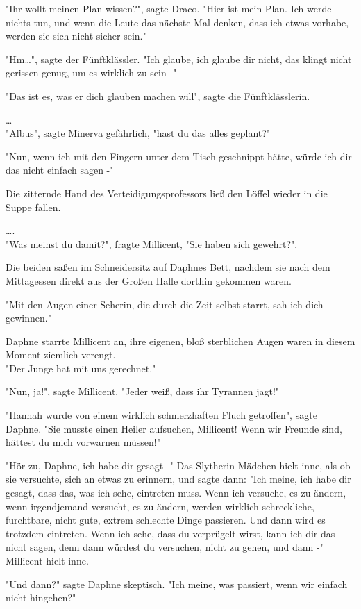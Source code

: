 {"Ihr wollt meinen Plan wissen?", sagte Draco. "Hier ist mein Plan. Ich werde nichts tun, und wenn die Leute das nächste Mal denken, dass ich etwas vorhabe, werden sie sich nicht sicher sein."

"Hm…", sagte der Fünftklässler. "Ich glaube, ich glaube dir nicht, das klingt nicht gerissen genug, um es wirklich zu sein -"

"Das ist es, was er dich glauben machen will", sagte die Fünftklässlerin.

…\\ "Albus", sagte Minerva gefährlich, "hast du das alles geplant?"

"Nun, wenn ich mit den Fingern unter dem Tisch geschnippt hätte, würde ich dir das nicht einfach sagen -"

Die zitternde Hand des Verteidigungsprofessors ließ den Löffel wieder in die Suppe fallen.

….\\ "Was meinst du damit?", fragte Millicent, "Sie haben sich gewehrt?".

Die beiden saßen im Schneidersitz auf Daphnes Bett, nachdem sie nach dem Mittagessen direkt aus der Großen Halle dorthin gekommen waren.

"Mit den Augen einer Seherin, die durch die Zeit selbst starrt, sah ich dich gewinnen."

Daphne starrte Millicent an, ihre eigenen, bloß sterblichen Augen waren in diesem Moment ziemlich verengt.\\ "Der Junge hat mit uns gerechnet."

"Nun, ja!", sagte Millicent. "Jeder weiß, dass ihr Tyrannen jagt!"

"Hannah wurde von einem wirklich schmerzhaften Fluch getroffen", sagte Daphne. "Sie musste einen Heiler aufsuchen, Millicent! Wenn wir Freunde sind, hättest du mich vorwarnen müssen!"

"Hör zu, Daphne, ich habe dir gesagt -" Das Slytherin-Mädchen hielt inne, als ob sie versuchte, sich an etwas zu erinnern, und sagte dann: "Ich meine, ich habe dir gesagt, dass das, was ich sehe, eintreten muss. Wenn ich versuche, es zu ändern, wenn irgendjemand versucht, es zu ändern, werden wirklich schreckliche, furchtbare, nicht gute, extrem schlechte Dinge passieren. Und dann wird es trotzdem eintreten. Wenn ich sehe, dass du verprügelt wirst, kann ich dir das nicht sagen, denn dann würdest du versuchen, nicht zu gehen, und dann -" Millicent hielt inne.

"Und dann?" sagte Daphne skeptisch. "Ich meine, was passiert, wenn wir einfach nicht hingehen?"

}
